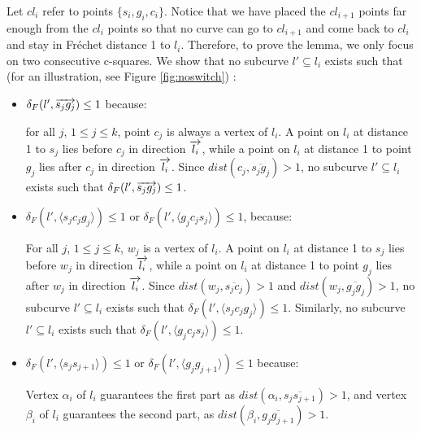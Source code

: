 \documentclass[12pt]{dalthesis}
\def\favoritefont{\bfseries \sffamily}
\def\QED{\ensuremath{{\Box}}}
\def\markatright#1{\leavevmode\unskip\nobreak\quad\hspace*{\fill}{#1}}
\newenvironment{proof}
	{\begin{trivlist}\item[\hskip\labelsep{\favoritefont Proof:}]}
	{\markatright{\QED}\end{trivlist}}
\newcommand{\Frechet}{Fr\'echet }
\newcommand{\distF}{\delta_F}
\newcommand{\gre}{{g}}
\newcommand{\sma}{{s}}
\newcommand{\Seg}[1]{{\overline{#1}}}
\newcommand{\cfev}{{l}}
\begin{document}
\begin{proof}
Let 
$cl_i$ refer to 
points $\{s_i,g_i,c_i\}$.
Notice that we have placed the $cl_{i+1}$ points far enough from 
the $cl_{i}$ points so that 
no curve can go to $cl_{i+1}$
and come back to $cl_i$ and stay 
in \Frechet distance 1 to $\cfev_i$.
Therefore, to prove the lemma, 
we only focus on two consecutive c-squares.
We show that no subcurve $l' \subseteq \cfev_i$ exists such 
that (for an illustration, see Figure \ref{fig:noswitch}) :


\begin{itemize}

\item $\distF(l',\Dir{\sma_j\gre_j}) \le 1$ because:



for all $j$, $1 \le j \le k$, point $c_j$ is always a vertex of $\cfev_i$. 
A point on $\cfev_i$ at distance 1 
to $\sma_j$ lies before $c_j$ 
in direction $\Dir{\cfev_i}$, 
while a point on $\cfev_i$ at distance 1 
to point $\gre_j$ lies after $c_j$ in direction $\Dir{\cfev_i}$.
Since $dist(c_j, \Seg{\sma_j\gre_j}) >1$, 
no subcurve $l' \subseteq \cfev_i$ exists such that 
$\distF(l',\Dir{\sma_j\gre_j}) \le 1$.




\item $\distF(l',\langle \sma_jc_j\gre_{j}\rangle) \le 1$ or $\distF(l',\langle\gre_jc_j\sma_{j}\rangle) \le 1$, because:



For all $j$, $1 \le j \le k$, $w_j$
is a vertex of $\cfev_i$. 
A point on $\cfev_i$ at distance 1 
to $\sma_j$ lies before $w_j$ 
in direction $\Dir{\cfev_i}$, 
while a point on $\cfev_i$ at distance 1 
to point $\gre_j$ lies after $w_j$ in direction $\Dir{\cfev_i}$.
Since $dist(w_j, \Seg{\sma_jc_j}) >1$ and 
$dist(w_j, \Seg{\gre_j\gre_j}) >1$,
no subcurve $l' \subseteq \cfev_i$ exists such that 
$\distF(l', \langle \sma_jc_j\gre_{j}\rangle ) \le 1$.
Similarly,  no subcurve $l' \subseteq \cfev_i$ exists such that 
$\distF(l', \langle\gre_jc_j\sma_j\rangle ) \le 1$.



\item $\distF(l',\langle \sma_j\sma_{j+1} \rangle) \le 1$ or  $\distF(l',\langle\gre_j\gre_{j+1} \rangle) \le 1$ because:



Vertex $\alpha_{i}$ of $\cfev_{i}$
guarantees the first part as $dist( \alpha_{i},\Seg{\sma_j\sma_{j+1}}) > 1 $, 
and vertex $\beta_{i}$ of $\cfev_{i}$
guarantees the second part, 
as $dist( \beta_{i},\Seg{\gre_j\gre_{j+1}}) > 1$.




\end{itemize}
\end{proof}
\end{document}
